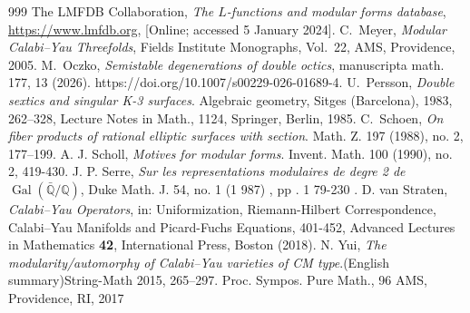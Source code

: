 \documentclass[12pt]{amsart}
\theoremstyle{plain}
\theoremstyle{remark}
\theoremstyle{definition}
\newcommand\QQ{{\mathbb Q}}
\numberwithin{table}{section}
\begin{document}
\begin{thebibliography}{999}
  The LMFDB Collaboration, \emph{The $L$-functions and modular forms database}, \url{https://www.lmfdb.org}, [Online; accessed 5 January 2024].
C.~Meyer, \emph{Modular Calabi--Yau Threefolds}, Fields Institute Monographs, Vol.~22, AMS, Providence, 2005.
M.~Oczko, \emph{Semistable degenerations of double octics},
manuscripta math. 177, 13 (2026). https://doi.org/10.1007/s00229-026-01689-4.
 U.~Persson, \emph{Double sextics and singular K-3 surfaces}. Algebraic geometry, Sitges (Barcelona), 1983, 262--328,
 Lecture Notes in Math., 1124, Springer, Berlin, 1985.
 C.~Schoen,
\emph{On fiber products of rational elliptic surfaces with section}.
Math. Z. 197 (1988), no. 2, 177--199.
A. J. Scholl,  \emph{Motives for modular forms}. Invent. Math. 100 (1990), no. 2, 419-430.
J. P. Serre, \emph{Sur les representations modulaires de degre 2 de $\operatorname{Gal}(\bar\QQ/\QQ)$}, Duke Math. J. 54,
no. 1 (1 987) , pp . 1 79-230 .
  D. van Straten, {\em Calabi--Yau Operators}, in: Uniformization,
 Riemann-Hilbert Correspondence, Calabi--Yau Manifolds and Picard-Fuchs
 Equations, 401-452, Advanced Lectures in Mathematics \textbf{42},
 International Press, Boston (2018).
 N. Yui, \emph{The modularity/automorphy of Calabi--Yau varieties of CM type}.(English summary)String-Math 2015, 265--297.
 Proc. Sympos. Pure Math., 96
 AMS, Providence, RI, 2017

\end{thebibliography}
\end{document}
